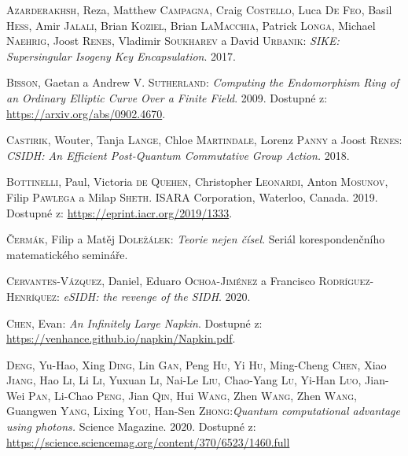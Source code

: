 \documentclass[12pt]{report}
\begin{document}
\begin{thebibliography}{97}

\textsc{Azarderakhsh}, Reza, Matthew \textsc{Campagna}, Craig \textsc{Costello}, Luca \textsc{De Feo}, Basil \textsc{Hess}, Amir \textsc{Jalali}, Brian \textsc{Koziel}, Brian \textsc{LaMacchia}, Patrick \textsc{Longa}, Michael \textsc{Naehrig}, Joost \textsc{Renes}, Vladimir \textsc{Soukharev} a David \textsc{Urbanik}: \textit{SIKE: Supersingular Isogeny Key Encapsulation}. 2017.

\textsc{Bisson}, Gaetan a Andrew V. \textsc{Sutherland}: \textit{Computing the Endomorphism Ring of an Ordinary Elliptic Curve Over a Finite Field}. 2009. Dostupné z: \url{https://arxiv.org/abs/0902.4670}.

\textsc{Castirik}, Wouter, Tanja \textsc{Lange}, Chloe \textsc{Martindale}, Lorenz \textsc{Panny} a Joost \textsc{Renes}: \textit{CSIDH: An Efficient Post-Quantum Commutative Group Action.} 2018.

\textsc{Bottinelli}, Paul, Victoria \textsc{de Quehen}, Christopher \textsc{Leonardi}, Anton \textsc{Mosunov}, Filip \textsc{Pawlega} a Milap \textsc{Sheth}. ISARA Corporation, Waterloo, Canada. 2019. Dostupné z: \url{https://eprint.iacr.org/2019/1333}.

\textsc{Čermák}, Filip a Matěj \textsc{Doležálek}: \textit{Teorie nejen čísel}. Seriál korespondenčního matematického semináře.

\textsc{Cervantes-Vázquez}, Daniel, Eduaro \textsc{Ochoa-Jiménez} a Francisco \textsc{Rodríguez-Henríquez}: \textit{eSIDH: the revenge of the SIDH}. 2020.

\textsc{Chen}, Evan: \textit{An Infinitely Large Napkin}. Dostupné z: \url{https://venhance.github.io/napkin/Napkin.pdf}.

\textsc{Deng}, Yu-Hao, Xing \textsc{Ding}, Lin \textsc{Gan}, Peng \textsc{Hu}, Yi \textsc{Hu}, Ming-Cheng \textsc{Chen}, Xiao \textsc{Jiang}, Hao \textsc{Li}, Li \textsc{Li}, Yuxuan \textsc{Li}, Nai-Le \textsc{Liu}, Chao-Yang \textsc{Lu}, Yi-Han \textsc{Luo}, Jian-Wei \textsc{Pan}, Li-Chao \textsc{Peng}, Jian \textsc{Qin}, Hui \textsc{Wang}, Zhen \textsc{Wang}, Zhen \textsc{Wang}, Guangwen \textsc{Yang}, Lixing \textsc{You}, Han-Sen \textsc{Zhong}:\textit{Quantum computational advantage using photons.} Science Magazine. 2020. Dostupné z: \url{https://science.sciencemag.org/content/370/6523/1460.full}


\end{thebibliography}
\end{document}
